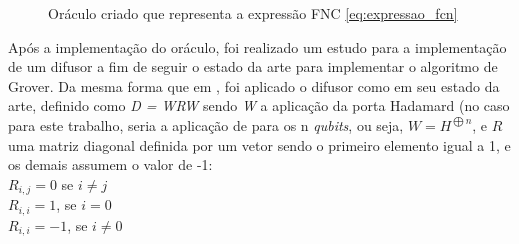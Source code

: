 \documentclass[12pt]{article}
\begin{document}
\begin{figure}[ht]
\centering
{}
\caption{Oráculo criado que representa a expressão FNC \ref{eq:expressao_fcn}}
\label{fig:oraculo_final}
\end{figure}

Após a implementação do oráculo, foi realizado um estudo para a implementação de um difusor a fim de seguir o estado da arte para implementar o algoritmo de Grover.
Da mesma forma que em \cite{gamberi:22}, foi aplicado o difusor como em seu estado da arte, definido como \textit{D = WRW} sendo \textit{W} a aplicação da porta Hadamard (no caso para este trabalho, seria a aplicação de para os n \textit{qubits}, ou seja, $W = {H}^{{\bigoplus}n}$, e $R$ uma matriz diagonal definida por um vetor sendo o primeiro elemento igual a 1, e os demais assumem o valor de -1:\\
$R_{i,j} = 0$ se $i \neq j$ \\
$R_{i,i} = 1$, se $i = 0$ \\
$R_{i,i} = -1$, se $i \neq 0$ \\
\end{document}
